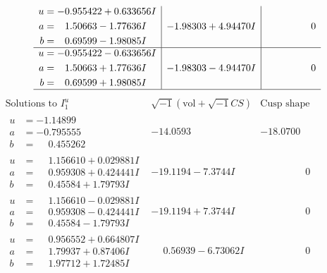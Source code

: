 \documentclass[1p]{elsarticle_modified}
\theoremstyle{definition}
\newcommand{\I}{\sqrt{-1}}
\begin{document}
$$\begin{array}{c|c|c}
\begin{aligned}
u &= -0.955422 + 0.633656 I \\
a &= \phantom{-}1.50663 - 1.77636 I \\
b &= \phantom{-}0.69599 - 1.98085 I\end{aligned}
 & -1.98303 + 4.94470 I & \phantom{-0.000000 } 0 \\ \hline\begin{aligned}
u &= -0.955422 - 0.633656 I \\
a &= \phantom{-}1.50663 + 1.77636 I \\
b &= \phantom{-}0.69599 + 1.98085 I\end{aligned}
 & -1.98303 - 4.94470 I & \phantom{-0.000000 } 0\\
 \hline 
 \end{array}$$\newpage$$\begin{array}{c|c|c}  
\text{Solutions to }I^u_{1}& \I (\text{vol} + \sqrt{-1}CS) & \text{Cusp shape}\\
 \hline 
\begin{aligned}
u &= -1.14899\phantom{ +0.000000I} \\
a &= -0.795555\phantom{ +0.000000I} \\
b &= \phantom{-}0.455262\phantom{ +0.000000I}\end{aligned}
 & -14.0593\phantom{ +0.000000I} & -18.0700\phantom{ +0.000000I} \\ \hline\begin{aligned}
u &= \phantom{-}1.156610 + 0.029881 I \\
a &= \phantom{-}0.959308 + 0.424441 I \\
b &= \phantom{-}0.45584 + 1.79793 I\end{aligned}
 & -19.1194 - 7.3744 I & \phantom{-0.000000 } 0 \\ \hline\begin{aligned}
u &= \phantom{-}1.156610 - 0.029881 I \\
a &= \phantom{-}0.959308 - 0.424441 I \\
b &= \phantom{-}0.45584 - 1.79793 I\end{aligned}
 & -19.1194 + 7.3744 I & \phantom{-0.000000 } 0 \\ \hline\begin{aligned}
u &= \phantom{-}0.956552 + 0.664807 I \\
a &= \phantom{-}1.79937 + 0.87406 I \\
b &= \phantom{-}1.97712 + 1.72485 I\end{aligned}
 & \phantom{-}0.56939 - 6.73062 I & \phantom{-0.000000 } 0 \\ \hline\begin{aligned}

\end{aligned}
\end{array}$$
\end{document}
